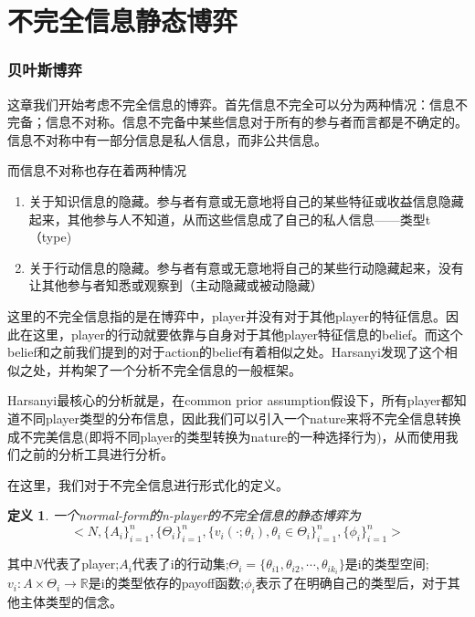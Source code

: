 \documentclass[UTF8,12pt]{ctexart}
\newtheorem{Def}{定义}[section]
\numberwithin{equation}{section} %
\numberwithin{figure}{section}
\numberwithin{table}{section}
\begin{document}
	\newpage
	
	\part{不完全信息静态博弈}
	
	\section{贝叶斯博弈}
	
	这章我们开始考虑不完全信息的博弈。首先信息不完全可以分为两种情况：信息不完备；信息不对称。信息不完备中某些信息对于所有的参与者而言都是不确定的。信息不对称中有一部分信息是私人信息，而非公共信息。
	
	而信息不对称也存在着两种情况
	\begin{enumerate}
		\item 关于知识信息的隐藏。参与者有意或无意地将自己的某些特征或收益信息隐藏起来，其他参与人不知道，从而这些信息成了自己的私人信息——类型t （type) 
		
		\item 关于行动信息的隐藏。参与者有意或无意地将自己的某些行动隐藏起来，没有让其他参与者知悉或观察到（主动隐藏或被动隐藏）
	\end{enumerate}
	
	
	这里的不完全信息指的是在博弈中，player并没有对于其他player的特征信息。因此在这里，player的行动就要依靠与自身对于其他player特征信息的belief。而这个belief和之前我们提到的对于action的belief有着相似之处。Harsanyi发现了这个相似之处，并构架了一个分析不完全信息的一般框架。
	
	Harsanyi最核心的分析就是，在common prior assumption假设下，所有player都知道不同player类型的分布信息，因此我们可以引入一个nature来将不完全信息转换成不完美信息(即将不同player的类型转换为nature的一种选择行为)，从而使用我们之前的分析工具进行分析。
	
	在这里，我们对于不完全信息进行形式化的定义。
	\begin{Def}
		一个normal-form的n-player的不完全信息的静态博弈为
		\begin{equation}
			<N,\{A_i\}_{i=1}^n,\{\Theta_i\}_{i=1}^n,\{v_i(\cdot;\theta_i),\theta_i \in \Theta_i\}_{i=1}^n,\{\phi_i\}_{i=1}^n>
		\end{equation}
	\end{Def}
	其中$N$代表了player;$A_i$代表了i的行动集;$\Theta_i = \{\theta_{i1},\theta_{i2},\cdots,\theta_{ik_i}\}$是i的类型空间;$v_i:A \times \Theta_i \rightarrow \mathbb{R}$是i的类型依存的payoff函数;$\phi_i$表示了在明确自己的类型后，对于其他主体类型的信念。	
	
\end{document}
